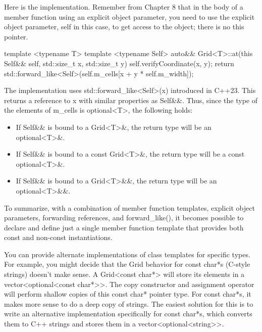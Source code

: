 Here is the implementation. Remember from Chapter 8 that in the body of a member function using an explicit object parameter, you need to use the explicit object parameter, self in this case, to get access to the object; there is no this pointer.

\begin{cpp}
template <typename T>
template <typename Self>
auto&& Grid<T>::at(this Self&& self, std::size_t x, std::size_t y)
{
    self.verifyCoordinate(x, y);
    return std::forward_like<Self>(self.m_cells[x + y * self.m_width]);
}
\end{cpp}

The implementation uses std::forward\_like<Self>(x) introduced in C++23. This returns a reference to x with similar properties as Self\&\&. Thus, since the type of the elements of m\_cells is optional<T>, the following holds:

\begin{itemize}
\item
If Self\&\& is bound to a Grid<T>\&, the return type will be an optional<T>\&.

\item
If Self\&\& is bound to a const Grid<T>\&, the return type will be a const optional<T>\&.

\item
If Self\&\& is bound to a Grid<T>\&\&, the return type will be an optional<T>\&\&.
\end{itemize}

To summarize, with a combination of member function templates, explicit object parameters, forwarding references, and forward\_like(), it becomes possible to declare and define just a single member function template that provides both const and non-const instantiations.


You can provide alternate implementations of class templates for specific types. For example, you might decide that the Grid behavior for const char*s (C-style strings) doesn’t make sense. A Grid<const char*> will store its elements in a vector<optional<const char*>{}>. The copy constructor and assignment operator will perform shallow copies of this const char* pointer type. For const char*s, it makes more sense to do a deep copy of strings. The easiest solution for this is to write an alternative implementation specifically for const char*s, which converts them to C++ strings and stores them in a vector<optional<string>{}>.

